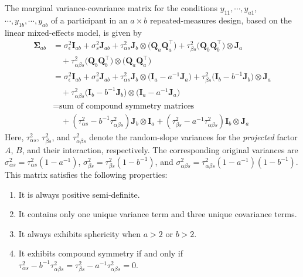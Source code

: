 \documentclass[preprint,12pt,authoryear]{elsarticle}
\begin{document}
The marginal variance-covariance matrix for the conditions $y_{11},\dotsb,y_{a1}$, $\dotsb,y_{1b},\dotsb,y_{ab}$ of a participant in an $a\times b$ repeated-measures design, based on the linear mixed-effects model, is given by
\begin{align*}
	\boldsymbol{\Sigma}_{ab}
	&=
	\sigma_\epsilon^2\mathbf{I}_{ab}
	+\sigma_s^2\mathbf{J}_{ab}
	+\tau_{\alpha s}^2\mathbf{J}_b\otimes\big(\mathbf{Q}_{a}\mathbf{Q}_{a}^\top\big)
	+\tau_{\beta s}^2\big(\mathbf{Q}_{b}\mathbf{Q}_{b}^\top\big)\otimes\mathbf{J}_a \\
	&\quad+\tau_{\alpha\beta s}^2\big(\mathbf{Q}_{b}\mathbf{Q}_{b}^\top\big)\otimes\big(\mathbf{Q}_{a}\mathbf{Q}_{a}^\top\big) \\
	&=
	\sigma_\epsilon^2\mathbf{I}_{ab}
	+\sigma_s^2\mathbf{J}_{ab}
	+\tau_{\alpha s}^2\mathbf{J}_b\otimes\big(\mathbf{I}_a-a^{-1}\mathbf{J}_a\big)
	+\tau_{\beta s}^2\big(\mathbf{I}_b-b^{-1}\mathbf{J}_b\big)\otimes\mathbf{J}_a \\
	&\quad+\tau_{\alpha\beta s}^2\big(\mathbf{I}_b-b^{-1}\mathbf{J}_b\big)\otimes\big(\mathbf{I}_a-a^{-1}\mathbf{J}_a\big) \\
	&=\text{sum of compound symmetry matrices} \\
	&\quad+(\tau_{\alpha s}^2-b^{-1}\tau_{\alpha\beta s}^2)\mathbf{J}_b\otimes\mathbf{I}_a +
	(\tau_{\beta s}^2-a^{-1}\tau_{\alpha\beta s}^2)\mathbf{I}_b\otimes\mathbf{J}_a
\end{align*}
Here, $\tau_{\alpha s}^2$, $\tau_{\beta s}^2$, and $\tau_{\alpha\beta s}^2$ denote the random-slope variances for the \textit{projected} factor $A$, $B$, and their interaction, respectively. The corresponding original variances are $\sigma_{\alpha s}^2=\tau_{\alpha s}^2\left(1-a^{-1}\right)$, $\sigma_{\beta s}^2=\tau_{\beta s}^2\left(1-b^{-1}\right)$, and $\sigma_{\alpha\beta s}^2=\tau_{\alpha\beta s}^2\left(1-a^{-1}\right)\left(1-b^{-1}\right)$. This matrix satisfies the following properties:
\begin{enumerate}[label=(\alph*)]
	\item It is always positive semi-definite.
	\item It contains only one unique variance term and three unique covariance terms.
	\item It always exhibits sphericity when $a>2$ or $b>2$.
	\item It exhibits compound symmetry if and only if $\tau_{\alpha s}^2-b^{-1}\tau_{\alpha\beta s}^2=\tau_{\beta s}^2-a^{-1}\tau_{\alpha\beta s}^2=0$.
\end{enumerate}
\end{document}
